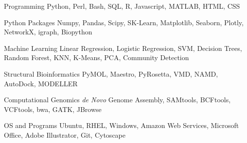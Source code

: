 \vspace{2mm}

\begin{cvskills}

  \cvskill
    {Programming} %
    {Python, Perl, Bash, SQL, R, Javascript, MATLAB, HTML, CSS} %

  \cvskill
    {Python Packages} %
    {Numpy, Pandas, Scipy, SK-Learn, Matplotlib, Seaborn, Plotly, NetworkX, igraph, Biopython} %
    
  \cvskill
    {Machine Learning} %
    {Linear Regression, Logistic Regression, SVM, Decision Trees, Random Forest, KNN, K-Means, PCA, Community Detection} %
    
  \cvskill
    {Structural Bioinformatics} %
    {PyMOL, Maestro, PyRosetta, VMD, NAMD, AutoDock, MODELLER} %

  \cvskill
    {Computational Genomics} %
    {\textit{de Novo} Genome Assembly, SAMtools, BCFtools, VCFtools, bwa, GATK, JBrowse} %

  \cvskill
    {OS and Programs} %
    {Ubuntu, RHEL, Windows, Amazon Web Services, Microsoft Office, Adobe Illustrator, Git, Cytoscape} %
    
\vspace{-8.0mm}
\end{cvskills}